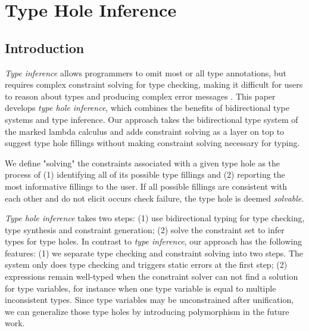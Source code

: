 



\section{Type Hole Inference}
\subsection{Introduction}
\label{sec:intro}
\emph{Type inference} allows programmers to omit most or all type annotations, but requires complex constraint solving for type checking, making it difficult for users to reason about types and producing complex error messages \cite{typeinferDif}. This paper develops \emph{type hole inference}, which combines the benefits of bidirectional type systems and type inference. Our approach takes the bidirectional type system of the marked lambda calculus and adds constraint solving as a layer on top to suggest type hole fillings without making constraint solving necessary for typing. 

We define "solving" the constraints associated with a given type hole as the process of (1) identifying all of its possible type fillings and (2) reporting the most informative fillings to the user. If all possible fillings are consistent with each other and do not elicit occurs check failure, the type hole is deemed \emph{solvable}.

\emph{Type hole inference} takes two steps: (1) use bidirectional typing for type checking, type synthesis and constraint generation; (2) solve the constraint set to infer types for type holes. In contrast to \emph{type inference}, our approach has the following features: (1) we separate type checking and constraint solving into two steps. The system only does type checking and triggers static errors at the first step; (2) expressions remain well-typed when the constraint solver can not find a solution for type variables, for instance when one type variable is equal to multiple inconsistent types. Since  type variables may be unconstrained after unification, we can generalize those type holes by introducing polymorphism in the future work. 

